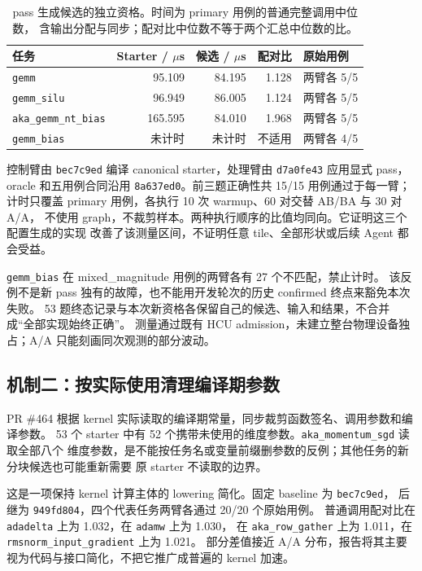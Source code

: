 \documentclass[UTF8,11pt,a4paper,fontset=none]{ctexart}
\newcommand{\code}[1]{\texttt{#1}}
\begin{document}
\begin{table}[htbp]
\centering\small
\caption{pass 生成候选的独立资格。时间为 primary 用例的普通完整调用中位数，
含输出分配与同步；配对比中位数不等于两个汇总中位数的比。}
\begin{tabularx}{\textwidth}{@{}Y r r r l@{}}
\toprule
{}任务 & Starter / $\mu$s & 候选 / $\mu$s & 配对比 & 原始用例 \\
\midrule
\code{gemm} & 95.109 & 84.195 & 1.128 & 两臂各 5/5 \\
\code{gemm\_silu} & 96.949 & 86.005 & 1.124 & 两臂各 5/5 \\
\code{aka\_gemm\_nt\_bias} & 165.595 & 84.010 & 1.968 & 两臂各 5/5 \\
\code{gemm\_bias} & 未计时 & 未计时 & 不适用 & 两臂各 4/5 \\
\bottomrule
\end{tabularx}
\end{table}

控制臂由 \code{bec7c9ed} 编译 canonical starter，处理臂由 \code{d7a0fe43} 应用显式 pass，
oracle 和五用例合同沿用 \code{8a637ed0}。前三题正确性共 15/15 用例通过于每一臂；
计时只覆盖 primary 用例，各执行 10 次 warmup、60 对交替 AB/BA 与 30 对 A/A，
不使用 graph，不裁剪样本。两种执行顺序的比值均同向。它证明这三个配置生成的实现
改善了该测量区间，不证明任意 tile、全部形状或后续 Agent 都会受益\cite{bwmma}。

\code{gemm\_bias} 在 mixed\_magnitude 用例的两臂各有 27 个不匹配，禁止计时。
该反例不是新 pass 独有的故障，也不能用开发轮次的历史 confirmed 终点来豁免本次失败。
53 题终态记录与本次新资格各保留自己的候选、输入和结果，不合并成“全部实现始终正确”。
测量通过既有 HCU admission，未建立整台物理设备独占；A/A 只能刻画同次观测的部分波动。

\subsection{机制二：按实际使用清理编译期参数}

PR \#464 根据 kernel 实际读取的编译期常量，同步裁剪函数签名、调用参数和编译参数。
53 个 starter 中有 52 个携带未使用的维度参数。\code{aka\_momentum\_sgd} 读取全部八个
维度参数，是不能按任务名或变量前缀删参数的反例；其他任务的新分块候选也可能重新需要
原 starter 不读取的边界\cite{bwconstexpr}。

这是一项保持 kernel 计算主体的 lowering 简化。固定 baseline 为 \code{bec7c9ed}，
后继为 \code{949fd804}，四个代表任务两臂各通过 20/20 个原始用例。
普通调用配对比在 \code{adadelta} 上为 1.032，在 \code{adamw} 上为 1.030，
在 \code{aka\_row\_gather} 上为 1.011，在 \code{rmsnorm\_input\_gradient} 上为 1.021。
部分差值接近 A/A 分布，报告将其主要视为代码与接口简化，不把它推广成普遍的 kernel 加速。
\end{document}
